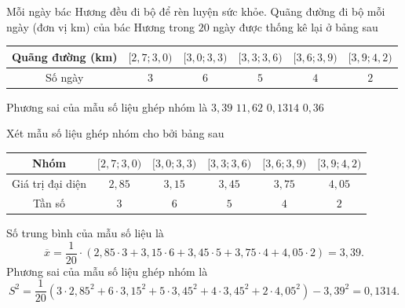 \begin{ex}%
	Mỗi ngày bác Hương đều đi bộ để rèn luyện sức khỏe. Quãng đường đi bộ mỗi ngày (đơn vị km) của bác Hương trong $20$ ngày được thống kê lại ở bảng sau
	\begin{center}
		\begin{tabular}{|c|c|c|c|c|c|}
			\hline
			Quãng đường (km)	&$[2{,}7;3{,}0)$  & $[3{,}0;3{,}3)$ & $[3{,}3;3{,}6)$ & $[3{,}6;3{,}9)$ & $[3{,}9;4{,}2)$ \\
			\hline
			Số ngày	& $3$ & $6$ & $5$ & $4$ & $2$ \\
			\hline
		\end{tabular}
	\end{center}
	Phương sai của mẫu số liệu ghép nhóm là
	\choice 
	{$3{,}39$}
	{$11{,}62$}
	{\True $0{,}1314$}
	{$0{,}36$}
	\loigiai 
	{
		Xét mẫu số liệu ghép nhóm cho bởi bảng sau
		\begin{center}
			\begin{tabular}{|c|c|c|c|c|c|}
				\hline
				Nhóm &$[2{,}7;3{,}0)$  & $[3{,}0;3{,}3)$ & $[3{,}3;3{,}6)$ & $[3{,}6;3{,}9)$ & $[3{,}9;4{,}2)$ \\
				\hline
				Giá trị đại diện & $2{,}85$ & $3{,}15$ & $3{,}45$ & $3{,}75$ & $4{,}05$ \\
				\hline
				Tần số	& $3$ & $6$ & $5$ & $4$ & $2$ \\
				\hline
			\end{tabular}
		\end{center}
		Số trung bình của mẫu số liệu là 
		$$\overline{x}=\dfrac{1}{20}\cdot (2{,}85\cdot 3+3{,}15\cdot 6+3{,}45\cdot 5+3{,}75\cdot 4+4{,}05\cdot 2)=3{,}39.$$
		Phương sai của mẫu số liệu ghép nhóm là 
		$$S^2=\dfrac{1}{20}\left(3\cdot 2{,}85^2+6\cdot 3{,}15^2+5\cdot 3{,}45^2+4\cdot 3{,}45^2+2\cdot 4{,}05^2\right)-3{,}39^2=0{,}1314.$$
	}
\end{ex}

